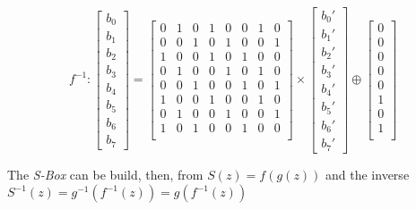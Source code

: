 \documentclass[10pt,a4paper,twoside]{llncs}
\begin{document}
\begin{equation}\label{eq:invSubBytes:matrix}
 f^{-1}:
 \left[
  \begin{array}{c}
    b_{0}\\b_{1}\\b_{2}\\b_{3}\\b_{4}\\b_{5}\\b_{6}\\b_{7}
  \end{array}
 \right]=\left[
  \begin{array}{cccccccc}
    0&1&0&1&0&0&1&0\\
    0&0&1&0&1&0&0&1\\
    1&0&0&1&0&1&0&0\\
    0&1&0&0&1&0&1&0\\
    0&0&1&0&0&1&0&1\\
    1&0&0&1&0&0&1&0\\
    0&1&0&0&1&0&0&1\\
    1&0&1&0&0&1&0&0\\
  \end{array}
 \right]\times\left[
  \begin{array}{c}
    b_{0}'\\b_{1}'\\b_{2}'\\b_{3}'\\b_{4}'\\b_{5}'\\b_{6}'\\b_{7}'
  \end{array}
 \right]\oplus\left[
  \begin{array}{c}
    0\\0\\0\\0\\0\\1\\0\\1\\
  \end{array}
 \right]
\end{equation}

The \emph{S-Box} can be build, then, from $S(z)=f(g(z))$ and the inverse $S^{-1}(z)=g^{-1}(f^{-1}(z))=g(f^{-1}(z))$
\end{document}
